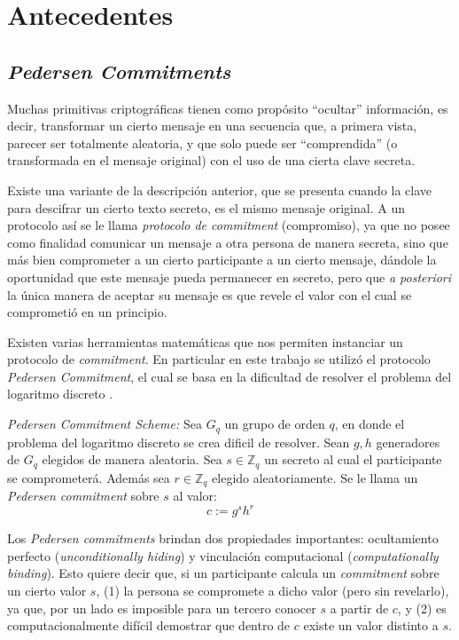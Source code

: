 \chapter{Antecedentes}
\section{\emph{Pedersen Commitments}}

Muchas primitivas criptográficas tienen como propósito ``ocultar'' información, es decir, transformar un cierto mensaje en una secuencia que, a primera vista, parecer ser totalmente aleatoria, y que solo puede ser ``comprendida'' (o transformada en el mensaje original) con el uso de una cierta clave secreta.

Existe una variante de la descripción anterior, que se presenta cuando la clave para descifrar un cierto texto secreto, es el mismo mensaje original. A un protocolo así se le llama \emph{protocolo de commitment} (compromiso), ya que no posee como finalidad comunicar un mensaje a otra persona de manera secreta, sino que más bien comprometer a un cierto participante a un cierto mensaje, dándole la oportunidad que este mensaje pueda permanecer en secreto, pero que \emph{a posteriori} la única manera de aceptar su mensaje es que revele el valor con el cual se comprometió en un principio.


Existen varias herramientas matemáticas que nos permiten instanciar un protocolo de \emph{commitment}. En particular en este trabajo se utilizó el protocolo \emph{Pedersen Commitment}\cite{pedersen1991non}, el cual se basa en la dificultad de resolver el problema del logaritmo discreto .

\emph{Pedersen Commitment Scheme:} Sea $G_q$ un grupo de orden $q$, en donde el problema del logaritmo discreto se crea dificil de resolver. Sean $g,h$ generadores de $G_q$ elegidos de manera aleatoria. Sea $s \in \mathbb{Z}_q$ un secreto al cual el participante se comprometerá. Además sea $r \in \mathbb{Z}_q$ elegido aleatoriamente. Se le llama un \emph{Pedersen commitment} sobre $s$ al valor: $$c := g^s h^r$$

Los \emph{Pedersen commitments} brindan dos propiedades importantes: 
  ocultamiento perfecto (\emph{unconditionally hiding}) y 
  vinculación computacional (\emph{computationally binding}). 
Esto quiere decir que, si un participante calcula un \emph{commitment} sobre un 
  cierto valor $s$, 
  (1) la persona se compromete a dicho valor (pero sin revelarlo), ya que, 
  por un lado es imposible para un tercero conocer $s$ a partir de $c$, 
  y (2) es computacionalmente difícil demostrar que dentro de $c$ existe un valor distinto a $s$.


